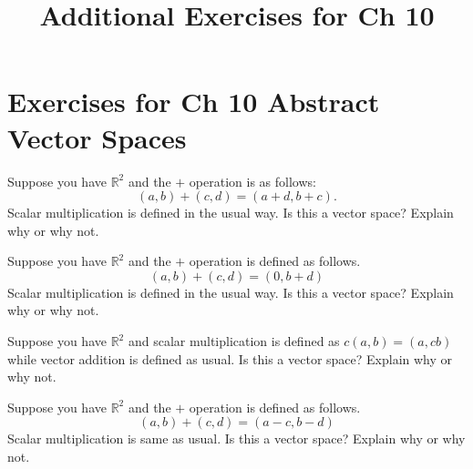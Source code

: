 \documentclass{ximera}
\title{Additional Exercises for Ch 10} \license{CC BY-NC-SA 4.0}
\begin{document}
\begin{abstract}
\end{abstract}
\maketitle

\section*{Exercises for Ch 10 Abstract Vector Spaces}


\begin{problem}\label{prb:10.1} Suppose you have $\mathbb{R}^{2}$ and the $+$ operation is as
follows:\
\begin{equation*}
\left( a,b\right) +\left( c,d\right) =\left( a+d,b+c\right) .
\end{equation*}
Scalar multiplication is defined in the usual way. Is this a vector space?
Explain why or why not.
\end{problem}

\begin{problem}\label{prb:10.2} Suppose you have $\mathbb{R}^{2}$ and the $+$ operation is defined as
follows.
\begin{equation*}
\left( a,b\right) +\left( c,d\right) =\left( 0,b+d\right)
\end{equation*}
Scalar multiplication is defined in the usual way. Is this a vector space?
Explain why or why not.
\end{problem}

\begin{problem}\label{prb:10.3} Suppose you have $\mathbb{R}^{2}$ and scalar multiplication is defined
as $c\left( a,b\right) =\left( a,cb\right) $ while vector addition is
defined as usual. Is this a vector space? Explain why or why not.
\end{problem}

\begin{problem}\label{prb:10.4} Suppose you have $\mathbb{R}^{2}$ and the $+$ operation is defined as
follows.
\begin{equation*}
\left( a,b\right) +\left( c,d\right) =\left( a-c,b-d\right)
\end{equation*}
Scalar multiplication is same as usual. Is this a vector space? Explain why
or why not.
\end{problem}
\end{document}

